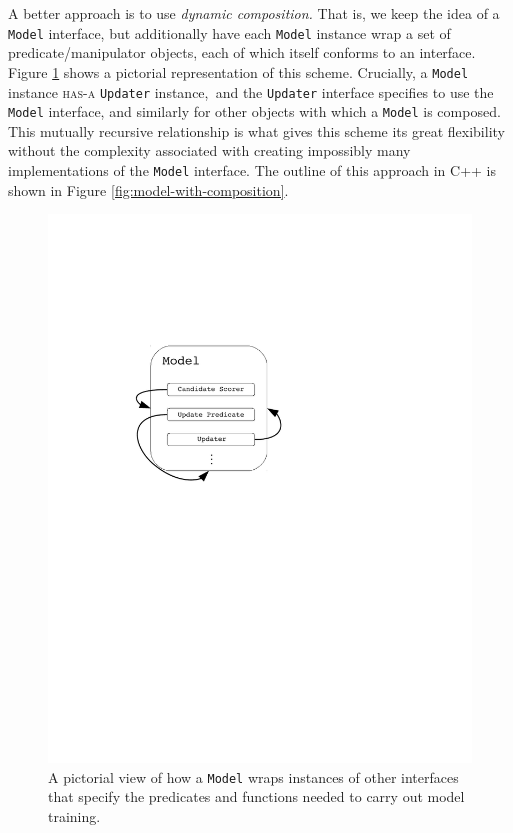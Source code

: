 \documentclass[a4paper]{article}
\newcommand{\noun}[1]{\textsc{#1}}
\begin{document}
A better approach is to use \emph{dynamic composition. }That is, we
keep\emph{ }the idea of a \texttt{Model} interface, but additionally
have each \texttt{Model} instance wrap a set of predicate/manipulator
objects, each of which itself conforms to an interface. Figure \ref{fig:pictorial-view-of-model}
shows a pictorial representation of this scheme. Crucially, a \texttt{Model}
instance \noun{has-a} \texttt{Updater} instance,\texttt{ }and the
\texttt{Updater} interface specifies to use the \texttt{Model} interface,
and similarly for other objects with which a \texttt{Model} is composed.
This mutually recursive relationship is what gives this scheme its
great flexibility without the complexity associated with creating
impossibly many implementations of the \texttt{Model} interface. The
outline of this approach in C++ is shown in Figure \ref{fig:model-with-composition}.
\begin{figure}
\begin{centering}
\includegraphics[bb=120bp 400bp 345bp 610bp,clip,scale=0.5]{graphics/model-diagram}
\par\end{centering}

\caption{\label{fig:pictorial-view-of-model}A pictorial view of how a \texttt{Model}
wraps instances of other interfaces that specify the predicates and
functions needed to carry out model training.}
\end{figure}
\end{document}
